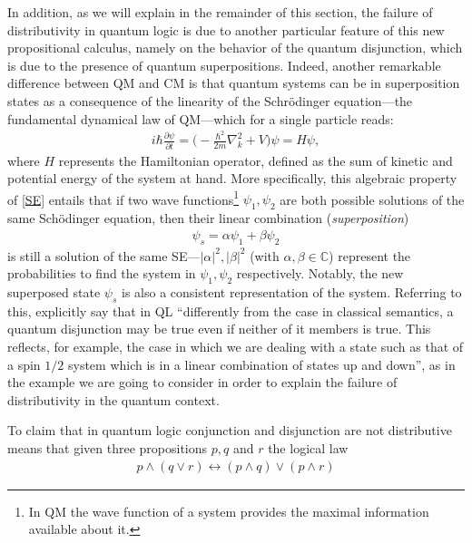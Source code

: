 \documentclass[11pt, executivepaper]{article}
\begin{document}
In addition, as we will explain in the remainder of this section, the failure of distributivity in quantum logic is due to another particular feature of this new propositional calculus, namely on the behavior of the quantum disjunction, which is due to the presence of quantum superpositions. Indeed, another remarkable difference between QM  and CM is that quantum systems can be in superposition states as a consequence of the linearity of the Schr\"odinger equation---the fundamental dynamical law of QM---which for a single particle reads: 
\begin{align}
\label{SE}
i\hbar\frac{\partial\psi}{\partial t}=\Big(-\frac{\hbar^2}{2m}\nabla_k^2+V\Big)\psi=H\psi,
\end{align}
\noindent where $H$ represents the Hamiltonian operator, defined as the sum of kinetic and potential energy of the system at hand. More specifically, this algebraic property of \eqref{SE} entails that if two wave functions\footnote{In QM the wave function of a system provides the maximal information available about it.} $\psi_1, \psi_2$ are both possible solutions of the same Sch\"odinger equation, then their linear combination (\emph{superposition}) 
\begin{align}
\label{SSE}
\psi_s=\alpha\psi_{1}+\beta\psi_{2}
\end{align} 
is still a solution of the same SE---$|\alpha|^2,|\beta|^2$ (with $\alpha,\beta\in\mathbb{C}$) represent the probabilities to find the system in $\psi_1, \psi_2$ respectively. Notably, the new superposed state $\psi_s$ is also a consistent representation of the system. Referring to this,  \cite{deRonde:2016} explicitly say that in QL ``differently from the case in classical semantics, a quantum disjunction may be true even if neither of it members is true. This reflects, for example, the case in which we are dealing with a state such as that of a spin $1/2$ system which is in a linear combination of states up and down'', as in the example we are going to consider in order to explain the failure of distributivity in the quantum context. 

To claim that in quantum logic conjunction and disjunction are not distributive means that given three propositions $p, q$ and $r$ the logical law
\begin{align}
\label{DL}
p\wedge(q\vee r)\longleftrightarrow(p\wedge q)\vee(p\wedge r)
\end{align}
\end{document}
